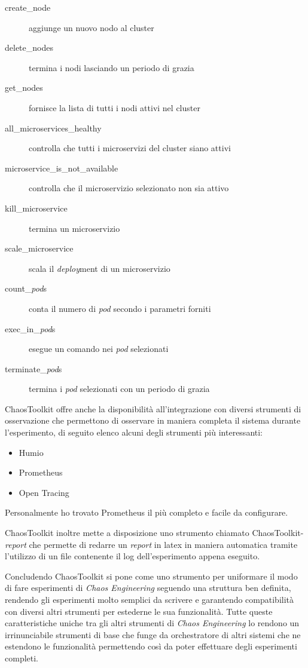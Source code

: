 \begin{description}
    \item[create\_node] aggiunge un nuovo nodo al cluster
    \item[delete\_nodes] termina i nodi lasciando un periodo di grazia
    \item[get\_nodes] fornisce la lista di tutti i nodi attivi nel cluster
    \item[all\_microservices\_healthy] controlla che tutti i microservizi del cluster siano attivi
    \item[microservice\_is\_not\_available] controlla che il microservizio selezionato non sia attivo
    \item[kill\_microservice] termina un microservizio
    \item[scale\_microservice] scala il \textit{deploy}ment di un microservizio
    \item[count\_\textit{pod}s] conta il numero di \textit{pod} secondo i parametri forniti
    \item[exec\_in\_\textit{pod}s] esegue un comando nei \textit{pod} selezionati
    \item[terminate\_\textit{pod}s] termina i \textit{pod} selezionati con un periodo di grazia 
\end{description}

ChaosToolkit offre anche la disponibilità all'integrazione con diversi strumenti di osservazione che permettono di osservare in maniera completa il sistema durante l'esperimento, di seguito elenco alcuni degli strumenti più interessanti:
\begin{itemize}
    \item Humio
    \item Prometheus
    \item Open Tracing
\end{itemize}
Personalmente ho trovato Prometheus il più completo e facile da configurare.

ChaosToolkit inoltre mette a disposizione uno strumento chiamato ChaosToolkit-\textit{report} che permette di redarre un \textit{report} in latex in maniera automatica tramite l'utilizzo di un file contenente il log dell'esperimento appena eseguito.

Concludendo ChaosToolkit si pone come uno strumento per uniformare il modo di fare esperimenti di \textit{Chaos Engineering} seguendo una struttura ben definita, rendendo gli esperimenti molto semplici da scrivere e garantendo compatibilità con diversi altri strumenti per estederne le sua funzionalità.
Tutte queste caratteristiche uniche tra gli altri strumenti di \textit{Chaos Engineering} lo rendono un irrinunciabile strumenti di base che funge da orchestratore di altri sistemi che ne estendono le funzionalità permettendo così da poter effettuare degli esperimenti completi.
